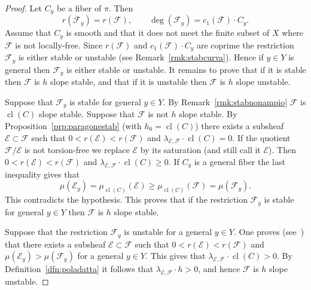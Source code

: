 \documentclass[11pt]{amsart}
\let\mathcal\mathscr
\def\cE{\mathcal{E}}
\def\cF{\mathcal{F}}
\DeclareMathOperator{\cl}{cl}
\theoremstyle{definition}
\theoremstyle{remark}
\begin{document}
\begin{proof}
%
Let  $C_y$ be a fiber of $\pi$. Then
%
\begin{equation}
%
r(\cF_y)=r(\cF),\qquad \deg(\cF_y)=c_1(\cF)\cdot C_y.
%
\end{equation}
%
Assume that $C_y$ is smooth  and that it does not meet the finite subset of $X$ where $\cF$ is not locally-free. Since  $r(\cF)$ and 
$c_1(\cF)\cdot C_y$ are coprime the restriction $\cF_y$ is either stable or unstable (see Remark~\ref{rmk:stabcurva}). 
Hence if $y\in Y$ is general then
 $\cF_y$    is either  stable or  unstable. It remains to prove that if 
it is stable then  $\cF$ is $h$ slope stable, and that if 
it is unstable  then  $\cF$ is $h$ slope unstable. 

Suppose that  $\cF_y$    is  stable for general $y\in Y$.  
By Remark~\ref{rmk:stabnonampio} $\cF$ is $\cl(C)$ slope stable. Suppose that $\cF$ is not $h$ slope stable. By Proposition~\ref{prp:paragonestab} (with $h_0=\cl(C)$) there  exists a subsheaf  $\cE\subset \cF$ such that 
$0<r(\cE)<r(\cF)$ and $\lambda_{\cE,\cF}\cdot \cl(C)= 0$. If the quotient $\cF/\cE$ is not torsion-free we replace $\cE$ by its saturation (and still call it $\cE$). Then $0<r(\cE)<r(\cF)$ and $\lambda_{\cE,\cF}\cdot \cl(C)\ge 0$. 
If $C_y$ is a general  fiber  the last inequality gives  that
%
\begin{equation}
%
\mu(\cE_y)=\mu_{\cl(C)}(\cE)\ge \mu_{\cl(C)}(\cF)=\mu(\cF_y).
%
\end{equation}
%
This contradicts the hypothesis. This proves that if  the restriction  $\cF_y$   is  stable for  general  $y\in Y$ then $\cF$ is $h$ slope stable. 

Suppose that the restriction  $\cF_y$    is  unstable for a general  $y\in Y$.  
 One proves
 (see~\cite[Thm.~2.3.2]{huy-lehn:librofasci}) that 
there exists a subsheaf  $\cE\subset \cF$ such that 
$0<r(\cE)<r(\cF)$ and $\mu(\cE_y)>\mu(\cF_y)$ for a general   $y\in Y$. This gives that $\lambda_{\cE,\cF}\cdot \cl(C)>0$. 
By Definition~\ref{dfn:poladatta} it follows that $\lambda_{\cE,\cF}\cdot h>0$, and hence $\cF$ is $h$ slope unstable.
%
\end{proof}
%
%
\end{document}
